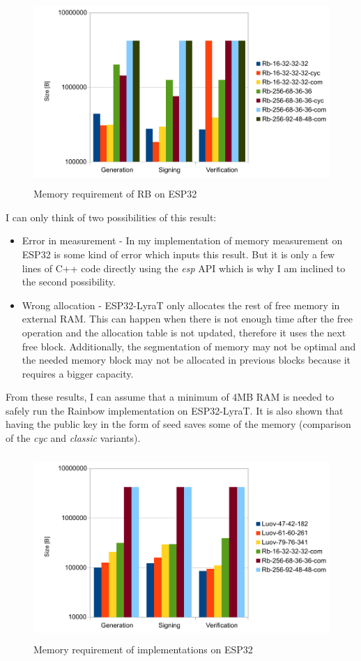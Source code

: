 \documentclass[thesis=M,english]{FITthesis}[2019/12/23]
\begin{document}
\begin{figure}[H]
\centering
\includegraphics[width=13cm,height=7cm]{images/mem-rb.pdf}
\caption{Memory requirement of RB on ESP32}
\label{mem-rb}
\end{figure}

\noindent
I can only think of two possibilities of this result:
\begin{itemize}
\item	Error in measurement - In my implementation of memory measurement on ESP32 is some kind of error which inputs this result. But it is only a few lines of C++ code directly using the \textit{esp} API which is why I am inclined to the second possibility. 
\item	Wrong allocation - ESP32-LyraT only allocates the rest of free memory in external RAM. This can happen when there is not enough time after the free operation and the allocation table is not updated, therefore it uses the next free block. Additionally, the segmentation of memory may not be optimal and the needed memory block may not be allocated in previous blocks because it requires a bigger capacity. 
\end{itemize}

\bigskip
\noindent
From these results, I can assume that a minimum of 4MB RAM is needed to safely run the Rainbow implementation on ESP32-LyraT. It is also shown that having the public key in the form of seed saves some of the memory (comparison of the \textit{cyc} and \textit{classic} variants).

\begin{figure}[H]
\centering
\includegraphics[width=13cm,height=7cm]{images/mem-both.pdf}
\caption{Memory requirement of implementations on ESP32}
\label{mem-both}
\end{figure}
\end{document}
